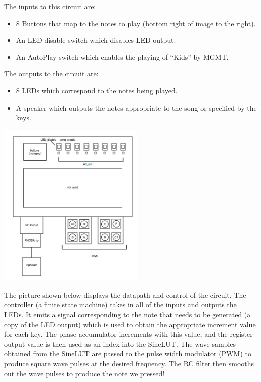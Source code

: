 \documentclass{article}
\begin{document}
    \vspace{-.8em}
    \begin{multicols}{2}
      The inputs to this circuit are:
      \begin{itemize}
        \item 8 Buttons that map to the notes to play (bottom right of image to the right).
        \item An LED disable switch which disables LED output.
        \item An AutoPlay switch which enables the playing of ``Kids'' by MGMT.
      \end{itemize}

      The outputs to the circuit are:
      \begin{itemize}
        \item 8 LEDs which correspond to the notes being played.
        \item A speaker which outputs the notes appropriate to the song or specified by the keys.
      \end{itemize}

    \columnbreak

      \includegraphics[width=2.75in]{img/FPGAtop.jpg}

    \end{multicols}

    \vspace{-1em}
    The picture shown below displays the datapath and control of the circuit. The controller (a finite state machine) takes in all of the inputs and outputs the LEDs. It emits a signal corresponding to the note that needs to be generated (a copy of the LED output) which is used to obtain the appropriate increment value for each key. The phase accumulator increments with this value, and the register output value is then used as an index into the SineLUT. The wave samples obtained from the SineLUT are passed to the pulse width modulator (PWM) to produce square wave pulses at the desired frequency. The RC filter then smooths out the wave pulses to produce the note we pressed! 
\end{document}
